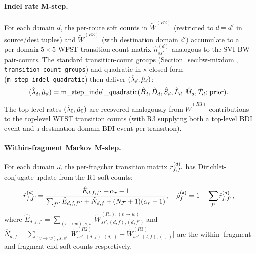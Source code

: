 \paragraph{Indel rate M-step.}
For each domain $d$, the per-route soft counts in $\tilde W^{(R2)}$
(restricted to $d = d'$ in source/dest tuples) and $\tilde W^{(R3)}$
(with destination domain $d'$) accumulate to a per-domain $5 \times 5$
WFST transition count matrix $\hat n^{(d)}_{ss'}$ analogous to
the SVI-BW pair-counts. The standard transition-count groups
(Section~\ref{sec:bw-mixdom}, \texttt{transition\_count\_groups}) and
quadratic-in-$\kappa$ closed form
(\texttt{m\_step\_indel\_quadratic}) then deliver
$(\hat{\lambda}_d, \hat{\mu}_d)$:
\begin{equation}
\label{eq:vbem-indel-mstep}
(\hat{\lambda}_d, \hat{\mu}_d) =
   \mathrm{m\_step\_indel\_quadratic}(\hat B_d, \hat D_d, \hat S_d, \hat L_d,
                                       \hat M_d, \hat T_d;\, \text{prior}).
\end{equation}
The top-level rates $(\hat{\lambda}_0, \hat{\mu}_0)$ are
recovered analogously from $\tilde W^{(R3)}$ contributions to the
top-level WFST transition counts (with R3 supplying both a top-level
BDI event and a destination-domain BDI event per transition).

\paragraph{Within-fragment Markov M-step.}
For each domain $d$, the per-fragchar transition matrix
$r^{(d)}_{f, f'}$ has Dirichlet-conjugate update from the R1
soft counts:
\begin{equation}
\label{eq:vbem-ext-mstep}
\hat{r}^{(d)}_{f, f'} = \frac{\hat E_{d, f, f'} + \alpha_r - 1}
                              {\sum_{f''} \hat E_{d, f, f''} + \hat N_{d, f}
                               + (N_{\mathcal{F}} + 1)(\alpha_r - 1)},
\quad
\hat{\rho}^{(d)}_f = 1 - \sum_{f'} \hat{r}^{(d)}_{f, f'},
\end{equation}
where $\hat E_{d, f, f'} = \sum_{(v\to w), s, s'} \tilde
W^{(R1), (v\to w)}_{ss', (d,f),(d,f')}$ and $\hat N_{d, f} =
\sum_{(v\to w), s, s'} \big[\tilde W^{(R2)}_{ss', (d,f),(d,\cdot)}
+ \tilde W^{(R3)}_{ss', (d,f),(\cdot,\cdot)}\big]$ are the within-
fragment and fragment-end soft counts respectively.

